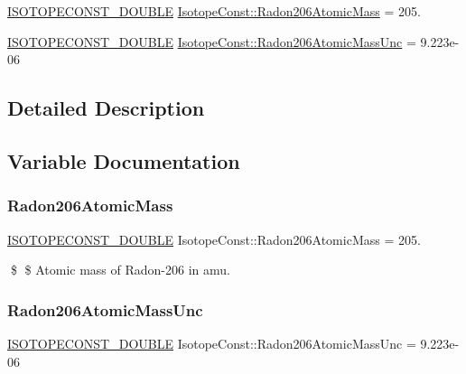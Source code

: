 \begin{DoxyCompactItemize}
\item 
\mbox{\hyperlink{group___isotope_const-_macros_ga8f45a7272ce02c0b4c65c44636ed719a}{I\+S\+O\+T\+O\+P\+E\+C\+O\+N\+S\+T\+\_\+\+D\+O\+U\+B\+LE}} \mbox{\hyperlink{group___isotope_const-_radon-_rn206_ga1c59347a79c55e816fa5384700363c87}{Isotope\+Const\+::\+Radon206\+Atomic\+Mass}} = 205.
\item 
\mbox{\hyperlink{group___isotope_const-_macros_ga8f45a7272ce02c0b4c65c44636ed719a}{I\+S\+O\+T\+O\+P\+E\+C\+O\+N\+S\+T\+\_\+\+D\+O\+U\+B\+LE}} \mbox{\hyperlink{group___isotope_const-_radon-_rn206_gadaef048886f594bd83d5df9fb3c3b4b4}{Isotope\+Const\+::\+Radon206\+Atomic\+Mass\+Unc}} = 9.\+223e-\/06
\end{DoxyCompactItemize}


\subsection{Detailed Description}


\subsection{Variable Documentation}
\mbox{\label{group___isotope_const-_radon-_rn206_ga1c59347a79c55e816fa5384700363c87}} 
\subsubsection{\texorpdfstring{Radon206\+Atomic\+Mass}{Radon206AtomicMass}}
{\footnotesize\ttfamily \mbox{\hyperlink{group___isotope_const-_macros_ga8f45a7272ce02c0b4c65c44636ed719a}{I\+S\+O\+T\+O\+P\+E\+C\+O\+N\+S\+T\+\_\+\+D\+O\+U\+B\+LE}} Isotope\+Const\+::\+Radon206\+Atomic\+Mass = 205.}

\$ \$ Atomic mass of Radon-\/206 in amu. \mbox{\label{group___isotope_const-_radon-_rn206_gadaef048886f594bd83d5df9fb3c3b4b4}} 
\subsubsection{\texorpdfstring{Radon206\+Atomic\+Mass\+Unc}{Radon206AtomicMassUnc}}
{\footnotesize\ttfamily \mbox{\hyperlink{group___isotope_const-_macros_ga8f45a7272ce02c0b4c65c44636ed719a}{I\+S\+O\+T\+O\+P\+E\+C\+O\+N\+S\+T\+\_\+\+D\+O\+U\+B\+LE}} Isotope\+Const\+::\+Radon206\+Atomic\+Mass\+Unc = 9.\+223e-\/06}

